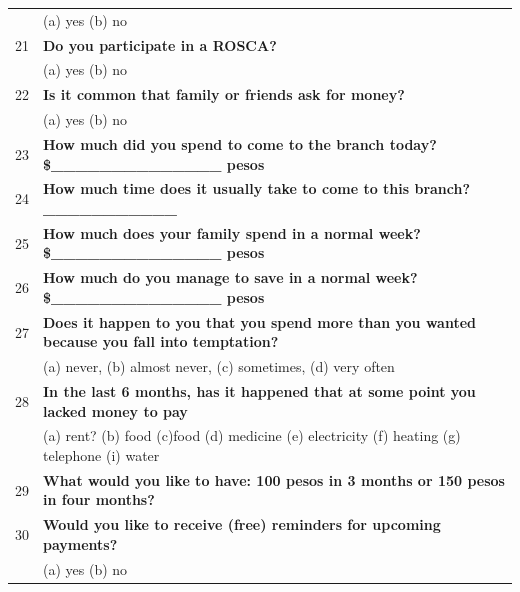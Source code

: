 \begin{tabular}{cl}
      & (a) yes  (b) no \\
\rowcolor[rgb]{ .682,  .667,  .667} 21    & \textbf{Do you participate in a ROSCA?} \\
      & (a) yes  (b) no \\
\rowcolor[rgb]{ .682,  .667,  .667} 22    & \textbf{Is it common that family or friends ask for money?} \\
      & (a) yes  (b) no \\
\rowcolor[rgb]{ .682,  .667,  .667} 23    & \textbf{How much did you spend to come to the branch today?    \$\_\_\_\_\_\_\_\_\_\_\_\_\_\_ pesos} \\
\rowcolor[rgb]{ .682,  .667,  .667} 24    & \textbf{How much time does it usually take to come to this branch?    \_\_\_\_\_\_\_\_\_\_\_} \\
25    & \textbf{How much does your family spend in a normal week?   \$\_\_\_\_\_\_\_\_\_\_\_\_\_\_ pesos} \\
26    & \textbf{How much do you manage to save in a normal week?   \$\_\_\_\_\_\_\_\_\_\_\_\_\_\_ pesos} \\
\rowcolor[rgb]{ .682,  .667,  .667} 27    & \textbf{Does it happen to you that you spend more than you wanted because you fall into temptation?} \\
      & (a) never, (b) almost never, (c) sometimes, (d) very often \\
\rowcolor[rgb]{ .682,  .667,  .667} 28    & \textbf{In the last 6 months, has it happened that at some point you lacked money to pay} \\
      & (a) rent?    (b) food    (c)food   (d) medicine  (e) electricity   (f) heating   (g) telephone    (i) water \\
\rowcolor[rgb]{ .682,  .667,  .667} 29    & \textbf{What would you like to have: 100 pesos in 3 months or 150 pesos in four months?} \\
\rowcolor[rgb]{ .682,  .667,  .667} 30    & \textbf{Would you like to receive (free) reminders for upcoming payments?} \\
      & (a) yes  (b) no \\
\bottomrule
\end{tabular}%
